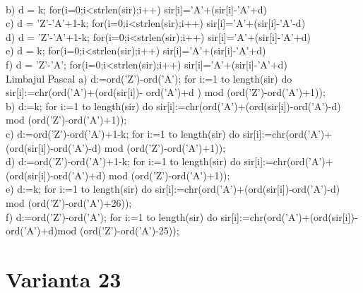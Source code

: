 {{\\
b) d = k; 
  for(i=0;i<strlen(sir);i++) 
    sir[i]='A'+(sir[i]-'A'+d)%
\\
c) d = 'Z'-'A'+1-k; 
  for(i=0;i<strlen(sir);i++) 
    sir[i]='A'+(sir[i]-'A'-d)%
\\
d) d = 'Z'-'A'+1-k; 
  for(i=0;i<strlen(sir);i++) 
    sir[i]='A'+(sir[i]-'A'+d)%
\\
e) d = k; 
  for(i=0;i<strlen(sir);i++) 
    sir[i]='A'+(sir[i]-'A'+d)%
\\
f) d = 'Z'-'A'; 
  for(i=0;i<strlen(sir);i++) 
    sir[i]='A'+(sir[i]-'A'+d)%
\\
Limbajul Pascal 
a) d:=ord('Z')-ord('A'); 
  for i:=1 to length(sir) do 
  sir[i]:=chr(ord('A')+(ord(sir[i])- ord('A')+d ) mod     
(ord('Z')-ord('A')+1)); 
\\
b) d:=k; 
  for i:=1 to length(sir) do 
  sir[i]:=chr(ord('A')+(ord(sir[i])-ord('A')-d) mod  
(ord('Z')-ord('A')+1)); 
\\
c) d:=ord('Z')-ord('A')+1-k; 
  for i:=1 to length(sir) do 
  sir[i]:=chr(ord('A')+(ord(sir[i])-ord('A')-d) mod 
(ord('Z')-ord('A')+1)); 
\\
d) d:=ord('Z')-ord('A')+1-k; 
  for i:=1 to length(sir) do 
  sir[i]:=chr(ord('A')+(ord(sir[i])-ord('A')+d) mod 
(ord('Z')-ord('A')+1)); 
\\
e) d:=k; 
  for i:=1 to length(sir) do 
  sir[i]:=chr(ord('A')+(ord(sir[i])-ord('A')-d) mod 
(ord('Z')-ord('A')+26)); 
\\
f) d:=ord('Z')-ord('A'); 
  for i:=1 to length(sir) do 
  sir[i]:=chr(ord('A')+(ord(sir[i])-ord('A')+d)mod 
(ord('Z')-ord('A')-25));
\\

\section*{Varianta 23}

}}
